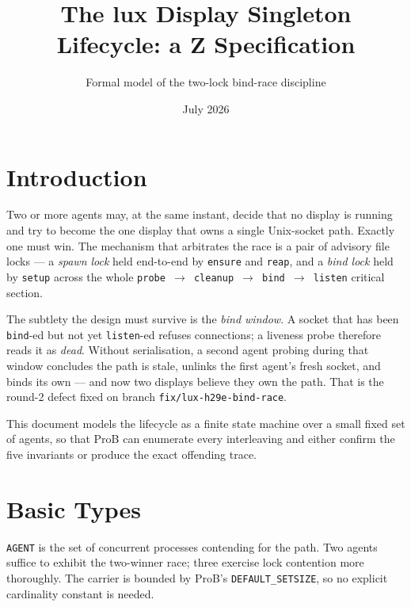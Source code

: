 \documentclass[a4paper,10pt,fleqn]{article}
\begin{document}
\title{The lux Display Singleton Lifecycle: a Z Specification}
\author{Formal model of the two-lock bind-race discipline}
\date{July 2026}
\maketitle

\section{Introduction}

Two or more agents may, at the same instant, decide that no display is
running and try to become the one display that owns a single Unix-socket
path.  Exactly one must win.  The mechanism that arbitrates the race is a
pair of advisory file locks --- a \emph{spawn lock} held end-to-end by
\texttt{ensure} and \texttt{reap}, and a \emph{bind lock} held by
\texttt{setup} across the whole
\texttt{probe $\to$ cleanup $\to$ bind $\to$ listen} critical section.

The subtlety the design must survive is the \emph{bind window}.  A socket
that has been \texttt{bind}-ed but not yet \texttt{listen}-ed refuses
connections; a liveness probe therefore reads it as \emph{dead}.  Without
serialisation, a second agent probing during that window concludes the
path is stale, unlinks the first agent's fresh socket, and binds its own
--- and now two displays believe they own the path.  That is the round-2
defect fixed on branch \texttt{fix/lux-h29e-bind-race}.

This document models the lifecycle as a finite state machine over a small
fixed set of agents, so that ProB can enumerate every interleaving and
either confirm the five invariants or produce the exact offending trace.

\section{Basic Types}

\begin{zed}
  [AGENT]
\end{zed}

\texttt{AGENT} is the set of concurrent processes contending for the
path.  Two agents suffice to exhibit the two-winner race; three exercise
lock contention more thoroughly.  The carrier is bounded by ProB's
\texttt{DEFAULT\_SETSIZE}, so no explicit cardinality constant is needed.
\end{document}

